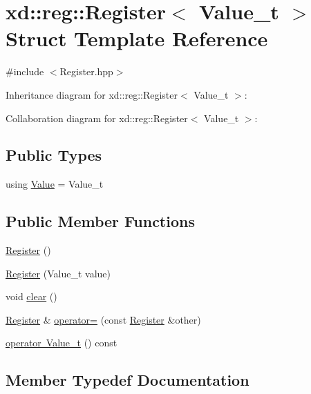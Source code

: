 \hypertarget{structxd_1_1reg_1_1_register}{}\section{xd\+:\+:reg\+:\+:Register$<$ Value\+\_\+t $>$ Struct Template Reference}
\label{structxd_1_1reg_1_1_register}


{\ttfamily \#include $<$Register.\+hpp$>$}



Inheritance diagram for xd\+:\+:reg\+:\+:Register$<$ Value\+\_\+t $>$\+:


Collaboration diagram for xd\+:\+:reg\+:\+:Register$<$ Value\+\_\+t $>$\+:
\subsection*{Public Types}
\begin{DoxyCompactItemize}
\item 
using \mbox{\hyperlink{structxd_1_1reg_1_1_register_a34f223cf12e3397d03ad34f54d634edd}{Value}} = Value\+\_\+t
\end{DoxyCompactItemize}
\subsection*{Public Member Functions}
\begin{DoxyCompactItemize}
\item 
\mbox{\hyperlink{structxd_1_1reg_1_1_register_a80781a5112e37e03a6b3d7ad843ce608}{Register}} ()
\item 
\mbox{\hyperlink{structxd_1_1reg_1_1_register_a0de38ec43de753e0038f14ab7bc0cd6e}{Register}} (Value\+\_\+t value)
\item 
void \mbox{\hyperlink{structxd_1_1reg_1_1_register_a032733592ab61abefcb55ee3fb8a434f}{clear}} ()
\item 
\mbox{\hyperlink{structxd_1_1reg_1_1_register}{Register}} \& \mbox{\hyperlink{structxd_1_1reg_1_1_register_a2f64c3d3e1a8530545e40741835c0c5d}{operator=}} (const \mbox{\hyperlink{structxd_1_1reg_1_1_register}{Register}} \&other)
\item 
\mbox{\hyperlink{structxd_1_1reg_1_1_register_aa3d969d5714a5b4b1431b2bd7599fe0c}{operator Value\+\_\+t}} () const
\end{DoxyCompactItemize}


\subsection{Member Typedef Documentation}
\mbox{\label{structxd_1_1reg_1_1_register_a34f223cf12e3397d03ad34f54d634edd}} 
